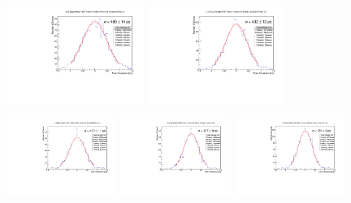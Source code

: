 \documentclass[12pt]{article}
\begin{document}
\begin{figure}[h]
\centering
	\includegraphics[width=0.4\textwidth]{SKIROC/SKIROC_1_Pixels500.pdf}
	\includegraphics[width=0.4\textwidth]{SKIROC/SKIROC_2_Pixels500.pdf}
	
	\includegraphics[width=0.32\textwidth]{SKIROC/SKIROC_3_Pixels500.pdf}
	\includegraphics[width=0.32\textwidth]{SKIROC/SKIROC_4_Pixels500.pdf}
	\includegraphics[width=0.32\textwidth]{SKIROC/SKIROC_5_Pixels500.pdf}
	

\end{figure}
\end{document}
